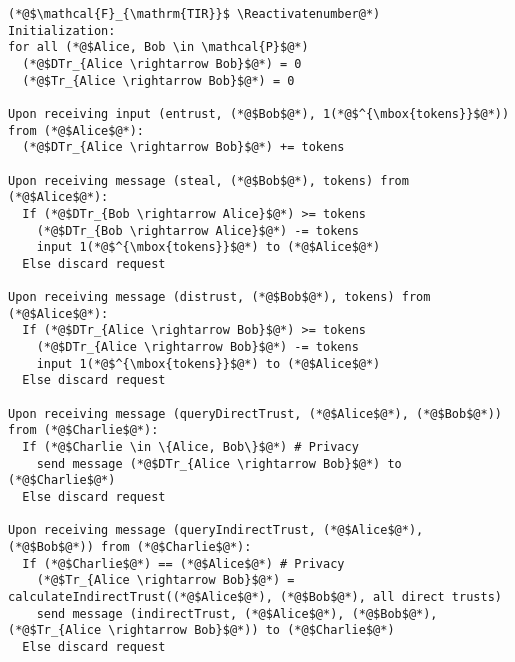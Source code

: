 \Suppressnumber
\begin{lstlisting}[label=tirfunc, style=numbers]
(*@$\mathcal{F}_{\mathrm{TIR}}$ \Reactivatenumber@*)
Initialization:
for all (*@$Alice, Bob \in \mathcal{P}$@*)
  (*@$DTr_{Alice \rightarrow Bob}$@*) = 0
  (*@$Tr_{Alice \rightarrow Bob}$@*) = 0

Upon receiving input (entrust, (*@$Bob$@*), 1(*@$^{\mbox{tokens}}$@*)) from (*@$Alice$@*):
  (*@$DTr_{Alice \rightarrow Bob}$@*) += tokens

Upon receiving message (steal, (*@$Bob$@*), tokens) from (*@$Alice$@*):
  If (*@$DTr_{Bob \rightarrow Alice}$@*) >= tokens
    (*@$DTr_{Bob \rightarrow Alice}$@*) -= tokens
    input 1(*@$^{\mbox{tokens}}$@*) to (*@$Alice$@*)
  Else discard request

Upon receiving message (distrust, (*@$Bob$@*), tokens) from (*@$Alice$@*):
  If (*@$DTr_{Alice \rightarrow Bob}$@*) >= tokens
    (*@$DTr_{Alice \rightarrow Bob}$@*) -= tokens
    input 1(*@$^{\mbox{tokens}}$@*) to (*@$Alice$@*)
  Else discard request

Upon receiving message (queryDirectTrust, (*@$Alice$@*), (*@$Bob$@*)) from (*@$Charlie$@*):
  If (*@$Charlie \in \{Alice, Bob\}$@*) # Privacy
    send message (*@$DTr_{Alice \rightarrow Bob}$@*) to (*@$Charlie$@*)
  Else discard request

Upon receiving message (queryIndirectTrust, (*@$Alice$@*), (*@$Bob$@*)) from (*@$Charlie$@*):
  If (*@$Charlie$@*) == (*@$Alice$@*) # Privacy
    (*@$Tr_{Alice \rightarrow Bob}$@*) = calculateIndirectTrust((*@$Alice$@*), (*@$Bob$@*), all direct trusts)
    send message (indirectTrust, (*@$Alice$@*), (*@$Bob$@*), (*@$Tr_{Alice \rightarrow Bob}$@*)) to (*@$Charlie$@*)
  Else discard request
\end{lstlisting}
